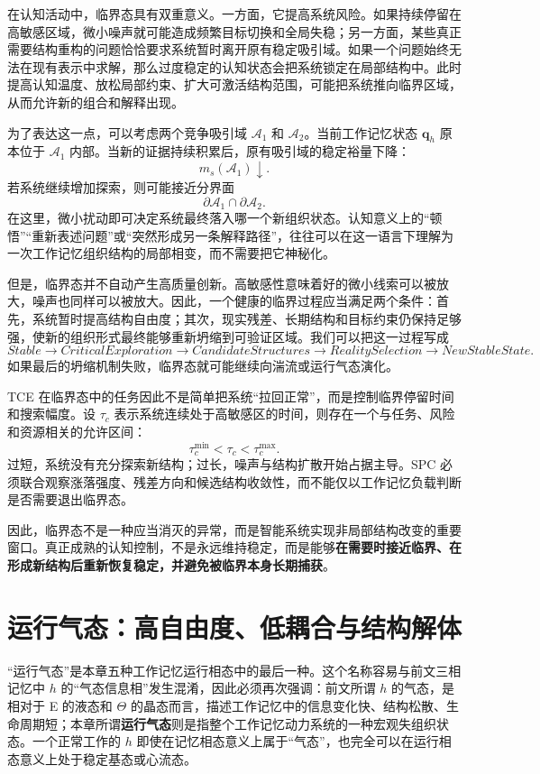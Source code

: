 在认知活动中，临界态具有双重意义。一方面，它提高系统风险。如果持续停留在高敏感区域，微小噪声就可能造成频繁目标切换和全局失稳；另一方面，某些真正需要结构重构的问题恰恰要求系统暂时离开原有稳定吸引域。如果一个问题始终无法在现有表示中求解，那么过度稳定的认知状态会把系统锁定在局部结构中。此时提高认知温度、放松局部约束、扩大可激活结构范围，可能把系统推向临界区域，从而允许新的组合和解释出现。

为了表达这一点，可以考虑两个竞争吸引域 $\mathcal A_1$ 和 $\mathcal A_2$。当前工作记忆状态 $\mathbf q_h$ 原本位于 $\mathcal A_1$ 内部。当新的证据持续积累后，原有吸引域的稳定裕量下降：
\[
m_s(\mathcal A_1)\downarrow.
\]
若系统继续增加探索，则可能接近分界面
\[
\partial\mathcal A_1\cap\partial\mathcal A_2.
\]
在这里，微小扰动即可决定系统最终落入哪一个新组织状态。认知意义上的“顿悟”“重新表述问题”或“突然形成另一条解释路径”，往往可以在这一语言下理解为一次工作记忆组织结构的局部相变，而不需要把它神秘化。

但是，临界态并不自动产生高质量创新。高敏感性意味着好的微小线索可以被放大，噪声也同样可以被放大。因此，一个健康的临界过程应当满足两个条件：首先，系统暂时提高结构自由度；其次，现实残差、长期结构和目标约束仍保持足够强，使新的组织形式最终能够重新坍缩到可验证区域。我们可以把这一过程写成
\[
Stable
\rightarrow
CriticalExploration
\rightarrow
CandidateStructures
\rightarrow
RealitySelection
\rightarrow
NewStableState.
\]
如果最后的坍缩机制失败，临界态就可能继续向湍流或运行气态演化。

TCE 在临界态中的任务因此不是简单把系统“拉回正常”，而是控制临界停留时间和搜索幅度。设 $\tau_c$ 表示系统连续处于高敏感区的时间，则存在一个与任务、风险和资源相关的允许区间：
\[
\tau_c^{\min}
<
\tau_c
<
\tau_c^{\max}.
\]
过短，系统没有充分探索新结构；过长，噪声与结构扩散开始占据主导。SPC 必须联合观察涨落强度、残差方向和候选结构收敛性，而不能仅以工作记忆负载判断是否需要退出临界态。

因此，临界态不是一种应当消灭的异常，而是智能系统实现非局部结构改变的重要窗口。真正成熟的认知控制，不是永远维持稳定，而是能够\textbf{在需要时接近临界、在形成新结构后重新恢复稳定，并避免被临界本身长期捕获}。

\section{运行气态：高自由度、低耦合与结构解体}

“运行气态”是本章五种工作记忆运行相态中的最后一种。这个名称容易与前文三相记忆中 $h$ 的“气态信息相”发生混淆，因此必须再次强调：前文所谓 $h$ 的气态，是相对于 E 的液态和 $\Theta$ 的晶态而言，描述工作记忆中的信息变化快、结构松散、生命周期短；本章所谓\textbf{运行气态}则是指整个工作记忆动力系统的一种宏观失组织状态。一个正常工作的 $h$ 即使在记忆相态意义上属于“气态”，也完全可以在运行相态意义上处于稳定基态或心流态。


